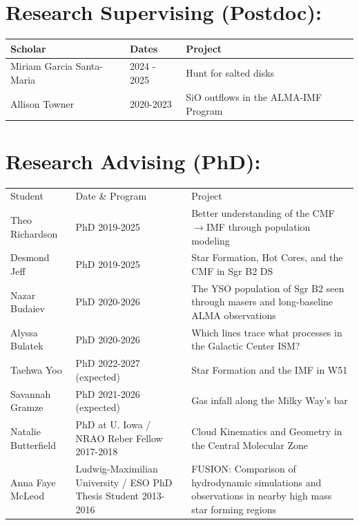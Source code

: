 \vspace{0.5cm}

\begin{minipage}{\textwidth}
\setlength{\extrarowheight}{4pt}
\section*{Research Supervising (Postdoc): }
\vspace{-12pt}
\begin{tabular}{lp{2.1in}p{2.6in}}
    Scholar & Dates  &   Project \\
    \hline
    Miriam Garcia Santa-Maria &  2024 - 2025 & Hunt for salted disks \\
    Allison Towner            &  2020-2023  & SiO outflows in the ALMA-IMF Program \\
\end{tabular}
\end{minipage}

\vspace{0.5cm}

\begin{minipage}{\textwidth}
\setlength{\extrarowheight}{4pt}
\section*{Research Advising (PhD): }
\vspace{-12pt}
\begin{tabular}{lp{2.1in}p{2.6in}}
    Student & Date  \& Program &   Project \\
    Theo Richardson     &  PhD 2019-2025  & Better understanding of the CMF$\rightarrow$IMF through population modeling  \\
    Desmond Jeff        &  PhD 2019-2025  & Star Formation, Hot Cores, and the CMF in Sgr B2 DS \\
    Nazar Budaiev       &  PhD 2020-2026  & The YSO population of Sgr B2 seen through masers and long-baseline ALMA observations  \\
    Alyssa Bulatek      &  PhD 2020-2026  & Which lines trace what processes in the Galactic Center ISM?  \\
    \hline
    Taehwa Yoo          &  PhD 2022-2027 (expected) & Star Formation and the IMF in W51 \\
    Savannah Gramze     &  PhD 2021-2026 (expected) & Gas infall along the Milky Way's bar \\
    \hline
    Natalie Butterfield &  PhD at U. Iowa / NRAO Reber Fellow 2017-2018   &                     Cloud Kinematics and Geometry in the Central Molecular Zone \\
    Anna Faye McLeod    &  Ludwig-Maximilian University / ESO PhD Thesis Student 2013-2016  &  FUSION: Comparison of hydrodynamic simulations and observations in nearby high mass star forming regions  \\
\end{tabular}
\end{minipage}


